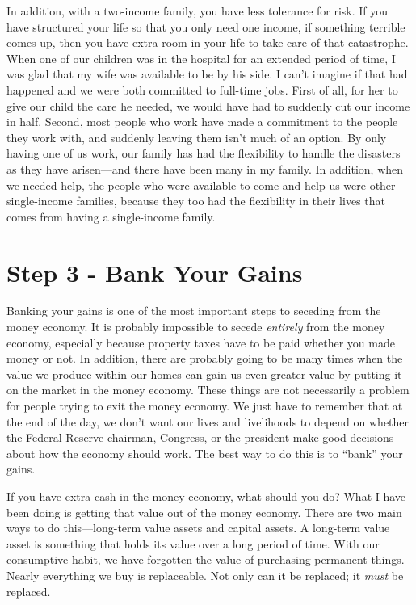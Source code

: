 \begin{infonote}
In addition, with a two-income family, you have less tolerance for risk.
If you have structured your life so that you only need one income, if
something terrible comes up, then you have extra room in your life to
take care of that catastrophe. When one of our children was in the
hospital for an extended period of time, I was glad that my wife was
available to be by his side. I can’t imagine if that had happened and
we were both committed to full-time jobs. First of all, for her to give
our child the care he needed, we would have had to suddenly cut our
income in half. Second, most people who work have made a commitment to
the people they work with, and suddenly leaving them isn’t much of an
option. By only having one of us work, our family has had the
flexibility to handle the disasters as they have arisen—and there have
been many in my family. In addition, when we needed help, the people
who were available to come and help us were other single-income
families, because they too had the flexibility in their lives that
comes from having a single-income family.
\end{infonote}

\section{Step 3 - Bank Your Gains}

Banking your gains is
one of the most important steps to seceding from the money economy. It
is probably impossible to secede \textit{entirely} from the money
economy, especially because property taxes have to be paid whether you
made money or not. In addition, there are probably going to be many
times when the value we produce within our homes can gain us even
greater value by putting it on the market in the money economy. These
things are not necessarily a problem for people trying to exit the
money economy. We just have to remember that at the end of the day, we
don’t want our lives and livelihoods to depend on whether the Federal
Reserve chairman, Congress, or the president make good decisions about
how the economy should work. The best way to do this is to “bank” your
gains.

If you have extra cash in the money economy, what should you do?  What I
have been doing is getting that value out of the money economy. There
are two main ways to do this—long-term value assets and capital assets.
A long-term value asset is something that holds its value over a long
period of time. With our consumptive habit, we have forgotten the value
of purchasing permanent things. Nearly everything we buy is
replaceable. Not only can it be replaced; it \textit{must} be replaced.

